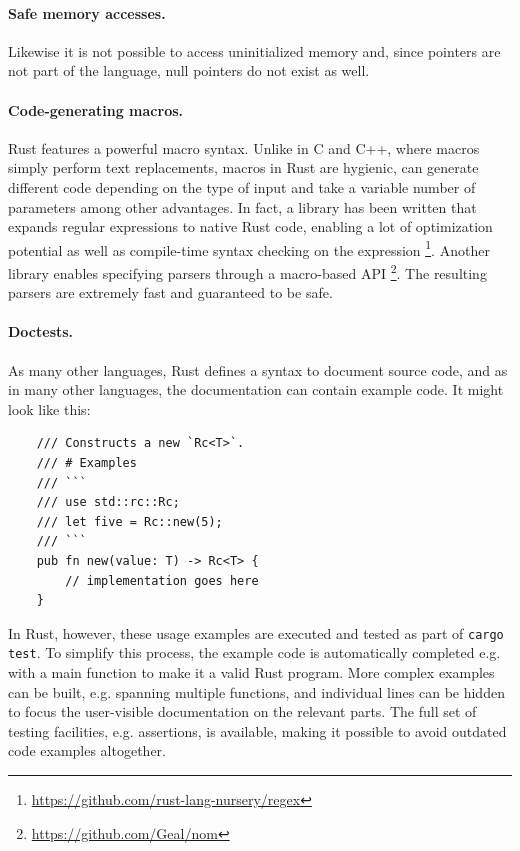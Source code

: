\documentclass{scrartcl}
\begin{document}
\paragraph{Safe memory accesses.} Likewise it is not possible to access uninitialized memory and, since pointers are not part of the language, null pointers do not exist as well.

\paragraph{Code-generating macros.} Rust features a powerful macro syntax. Unlike in C and C++, where macros simply perform text replacements, macros in Rust are hygienic, can generate different code depending on the type of input and take a variable number of parameters among other advantages. In fact, a library has been written that expands regular expressions to native Rust code, enabling a lot of optimization potential as well as compile-time syntax checking on the expression \footnote{\url{https://github.com/rust-lang-nursery/regex}}. Another library enables specifying parsers through a macro-based API \footnote{\url{https://github.com/Geal/nom}}. The resulting parsers are extremely fast and guaranteed to be safe.

\paragraph{Doctests.} As many other languages, Rust defines a syntax to document source code, and as in many other languages, the documentation can contain example code. It might look like this:

\small {
    \begin{verbatim}
    /// Constructs a new `Rc<T>`.
    /// # Examples
    /// ```
    /// use std::rc::Rc;
    /// let five = Rc::new(5);
    /// ```
    pub fn new(value: T) -> Rc<T> {
        // implementation goes here
    }
    \end{verbatim}
}

In Rust, however, these usage examples are executed and tested as part of \texttt{cargo test}. To simplify this process, the example code is automatically completed e.g. with a main function to make it a valid Rust program. More complex examples can be built, e.g. spanning multiple functions, and individual lines can be hidden to focus the user-visible documentation on the relevant parts. The full set of testing facilities, e.g. assertions, is available, making it possible to avoid outdated code examples altogether.
\end{document}
